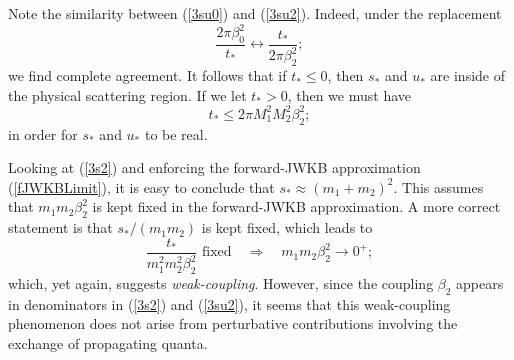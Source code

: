 Note the similarity between (\ref{3su0}) and (\ref{3su2}). Indeed, under the replacement
\begin{equation}
	\frac{2\pi \beta_{0}^{2}}{t_{*}} \longleftrightarrow \frac{t_{*}}{2\pi \beta_{2}^{2}};
\end{equation}
we find complete agreement. It follows that if $t_{*} \leq 0$, then $s_{*}$ and $u_{*}$ are inside of the physical scattering region. If we let $t_{*} > 0$, then we must have
\begin{equation}
	t_{*} \leq 2 \pi M_{1}^{2} M_{2}^{2} \beta_{2}^{2};
\end{equation}
in order for $s_{*}$ and $u_{*}$ to be real.

Looking at (\ref{3s2}) and enforcing the forward-JWKB approximation (\ref{fJWKBLimit}), it is easy to conclude that $s_{*} \approx (m_{1} + m_{2})^{2}$. This assumes that $m_{1} m_{2} \beta_{2}^{2}$ is kept fixed in the forward-JWKB approximation. A more correct statement is that $s_{*} / (m_{1} m_{2})$ is kept fixed, which leads to
\begin{equation}
	\frac{t_{*}}{m_{1}^{2} m_{2}^{2} \beta_{2}^{2}} \text{ fixed} \quad \Longrightarrow \quad m_{1} m_{2} \beta_{2}^{2} \rightarrow 0^{+};
\end{equation}
which, yet again, suggests \textit{weak-coupling}. However, since the coupling $\beta_{2}$ appears in denominators in (\ref{3s2}) and (\ref{3su2}), it seems that this weak-coupling phenomenon does not arise from perturbative contributions involving the exchange of propagating quanta.